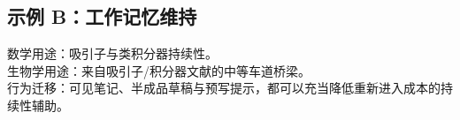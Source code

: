 \subsection*{示例 B：工作记忆维持}

数学用途：吸引子与类积分器持续性。\\
生物学用途：来自吸引子/积分器文献的中等车道桥梁。\\
行为迁移：可见笔记、半成品草稿与预写提示，都可以充当降低重新进入成本的持续性辅助。